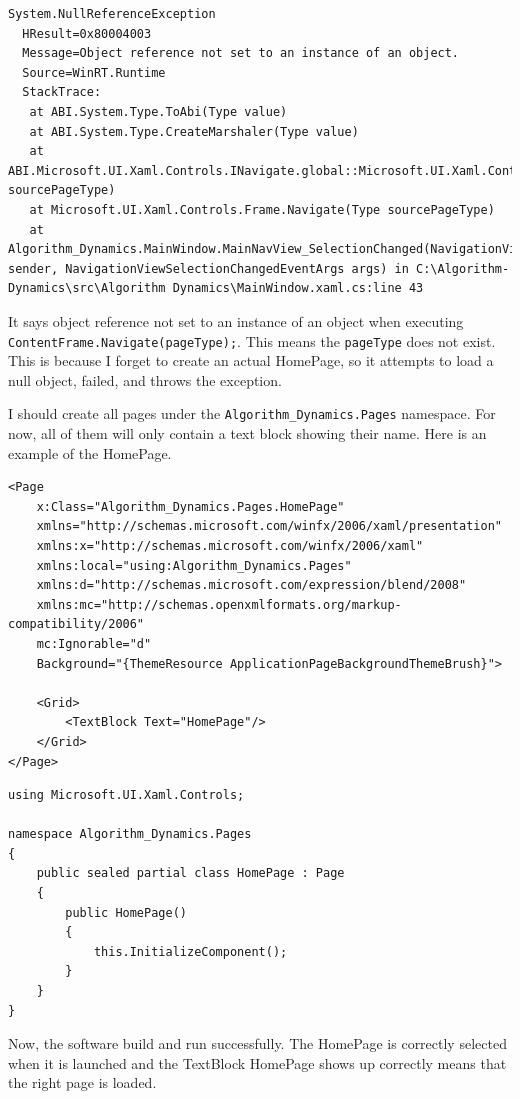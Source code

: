 \documentclass[a4paper]{report}
\begin{document}
\begin{verbatim}
System.NullReferenceException
  HResult=0x80004003
  Message=Object reference not set to an instance of an object.
  Source=WinRT.Runtime
  StackTrace:
   at ABI.System.Type.ToAbi(Type value)
   at ABI.System.Type.CreateMarshaler(Type value)
   at ABI.Microsoft.UI.Xaml.Controls.INavigate.global::Microsoft.UI.Xaml.Controls.INavigate.Navigate(Type sourcePageType)
   at Microsoft.UI.Xaml.Controls.Frame.Navigate(Type sourcePageType)
   at Algorithm_Dynamics.MainWindow.MainNavView_SelectionChanged(NavigationView sender, NavigationViewSelectionChangedEventArgs args) in C:\Algorithm-Dynamics\src\Algorithm Dynamics\MainWindow.xaml.cs:line 43
\end{verbatim}


It says object reference not set to an instance of an object when executing \texttt{ContentFrame.Navigate(pageType);}. This means the \texttt{pageType} does not exist. This is because I forget to create an actual HomePage, so it attempts to load a null object, failed, and throws the exception.  

I should create all pages under the \texttt{Algorithm_Dynamics.Pages} namespace. For now, all of them will only contain a text block showing their name. Here is an example of the HomePage.

\begin{verbatim}
<Page
    x:Class="Algorithm_Dynamics.Pages.HomePage"
    xmlns="http://schemas.microsoft.com/winfx/2006/xaml/presentation"
    xmlns:x="http://schemas.microsoft.com/winfx/2006/xaml"
    xmlns:local="using:Algorithm_Dynamics.Pages"
    xmlns:d="http://schemas.microsoft.com/expression/blend/2008"
    xmlns:mc="http://schemas.openxmlformats.org/markup-compatibility/2006"
    mc:Ignorable="d"
    Background="{ThemeResource ApplicationPageBackgroundThemeBrush}">

    <Grid>
        <TextBlock Text="HomePage"/>
    </Grid>
</Page>
\end{verbatim}


\begin{verbatim}
using Microsoft.UI.Xaml.Controls;

namespace Algorithm_Dynamics.Pages
{
    public sealed partial class HomePage : Page
    {
        public HomePage()
        {
            this.InitializeComponent();
        }
    }
}
\end{verbatim}

Now, the software build and run successfully. The HomePage is correctly selected when it is launched and the TextBlock HomePage shows up correctly means that the right page is loaded.
\end{document}
